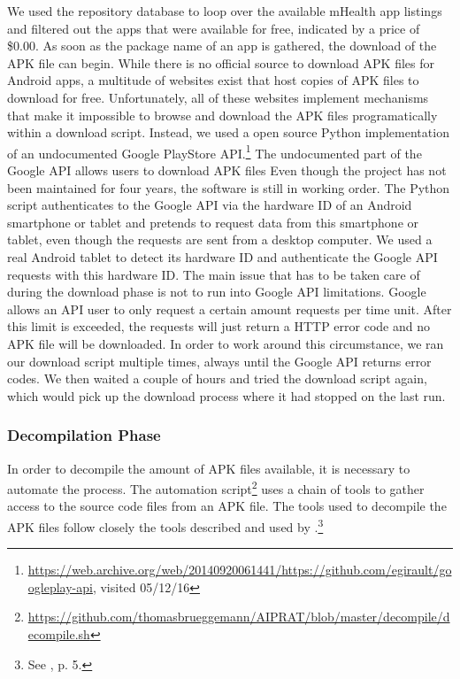 We used the repository database to loop over the available mHealth app listings and filtered out the apps that were available for free, indicated by a price of \$0.00.
As soon as the package name of an app is gathered, the download of the \acs{APK} file can begin. 
While there is no official source to download \acs{APK} files for Android apps, a multitude of websites exist that host copies of \acs{APK} files to download for free.
Unfortunately, all of these websites implement mechanisms that make it impossible to browse and download the APK files programatically within a download script.
Instead, we used a open source Python implementation of an undocumented Google PlayStore \acs{API}.\footnote{\url{https://web.archive.org/web/20140920061441/https://github.com/egirault/googleplay-api}, visited 05/12/16} 
The undocumented part of the Google API allows users to download APK files 
Even though the project has not been maintained for four years, the software is still in working order.
The Python script authenticates to the Google API via the hardware ID of an Android smartphone or tablet and pretends to request data from this smartphone or tablet, even though the requests are sent from a desktop computer.
We used a real Android tablet to detect its hardware ID and authenticate the Google API requests with this hardware ID.
The main issue that has to be taken care of during the download phase is not to run into Google API limitations. 
Google allows an API user to only request a certain amount requests per time unit. 
After this limit is exceeded, the requests will just return a HTTP error code and no APK file will be downloaded.
In order to work around this circumstance, we ran our download script multiple times, always until the Google API returns error codes. 
We then waited a couple of hours and tried the download script again, which would pick up the download process where it had stopped on the last run.

\subsubsection{Decompilation Phase}

In order to decompile the amount of APK files available, it is necessary to automate the process. 
The automation script\footnote{\url{https://github.com/thomasbrueggemann/AIPRAT/blob/master/decompile/decompile.sh}} uses a chain of tools to gather access to the source code files from an APK file.
The tools used to decompile the APK files follow closely the tools described and used by \cite{Enck2011}.\footnote{See \cite{Enck2011}, p. 5.}

